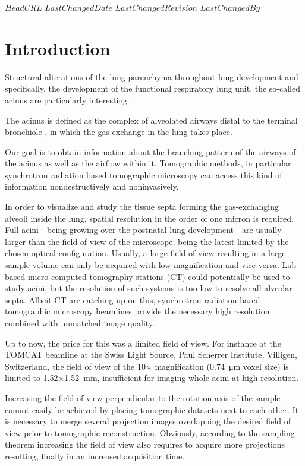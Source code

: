 \svnidlong
{$HeadURL$}
{$LastChangedDate$}
{$LastChangedRevision$}
{$LastChangedBy$}
%
\section{Introduction}
Structural alterations of the lung parenchyma throughout lung development and specifically, the development of the functional respiratory lung unit, the so-called acinus are particularly interesting \cite{Schittny2008,Mund2008,Tsuda2008}.

The acinus is defined as the complex of alveolated airways distal to the terminal bronchiole \cite{Rodriguez1987}, in which the gas-exchange in the lung takes place. 

Our goal is to obtain information about the branching pattern of the airways of the acinus as well as the airflow within it. Tomographic methods, in particular synchrotron radiation based tomographic microscopy can access this kind of information nondestructively and noninvasively. 

In order to visualize and study the tissue septa forming the gas-exchanging alveoli inside the lung, spatial resolution in the order of one micron is required. Full acini---being growing over the postnatal lung development---are usually larger than the field of view of the microscope, being the latest limited by the chosen optical configuration. Usually, a large field of view resulting in a large sample volume can only be acquired with low magnification and vice-versa. Lab-based micro-computed tomography stations (\micro CT) could potentially be used to study acini, but the resolution of such systems is too low to resolve all alveolar septa. Albeit \micro CT are catching up on this, synchrotron radiation based tomographic microscopy beamlines provide the necessary high resolution combined with unmatched image quality.

Up to now, the price for this was a limited field of view. For instance at the TOMCAT beamline \cite{Stampanoni2007} at the Swiss Light Source, Paul Scherrer Institute, Villigen, Switzerland, the field of view of the 10$\times$ magnification (\SI{0.74}{\micro\meter} voxel size) is limited to 1.52$\times$\SI{1.52}{\milli\meter}, insufficient for imaging whole acini at high resolution.

Increasing the field of view perpendicular to the rotation axis of the sample cannot easily be achieved by placing tomographic datasets next to each other. It is necessary to merge several projection images overlapping the desired field of view prior to tomographic reconstruction. Obviously, according to the sampling theorem increasing the field of view also requires to acquire more projections resulting, finally in an increased acquisition time.

